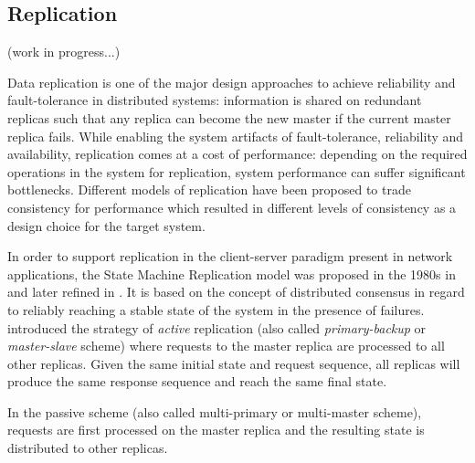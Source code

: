 \subsection{Replication}
\label{sec:replication}

(work in progress...)

Data replication is one of the major design approaches to achieve reliability and fault-tolerance in distributed systems: information is shared on redundant replicas such that any replica can become the new master if the current master replica fails. While enabling the system artifacts of fault-tolerance, reliability and availability, replication comes at a cost of performance: depending on the required operations in the system for replication, system performance can suffer significant bottlenecks. Different models of replication have been proposed to trade consistency for performance which resulted in different levels of consistency as a design choice for the target system.

In order to support replication in the client-server paradigm present in network applications, the State Machine Replication model was proposed in the 1980s in \cite{Lamport:1984} and later refined in \cite{Schneider:1990}. It is based on the concept of distributed consensus in regard to reliably reaching a stable state of the system in the presence of failures. \cite{Lamport:1984} introduced the strategy of \textit{active} replication (also called \textit{primary-backup} or \textit{master-slave} scheme) where requests to the master replica are processed to all other replicas. Given the same initial state and request sequence, all replicas will produce the same response sequence and reach the same final state. 

In the passive scheme (also called multi-primary or multi-master scheme), requests are first processed on the master replica and the resulting state is distributed to other replicas.
